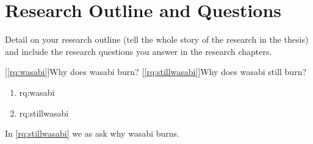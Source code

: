 
\section{Research Outline and Questions}
\label{section:introduction:rqs}

Detail on your research outline (tell the whole story of the research in the thesis) and include the research questions you answer in the research chapters.

[\ref{rq:wasabi}]{Why does wasabi burn?}
[\ref{rq:stillwasabi}]{Why does wasabi still burn?}
\begin{enumerate}[label=\textbf{RQ\arabic*},ref={RQ\arabic*},resume]
\item \acl{rq:wasabi}\label{rq:wasabi}
\item \acl{rq:stillwasabi}\label{rq:stillwasabi}
\end{enumerate}

In \ref{rq:stillwasabi} we as ask why wasabi burns.